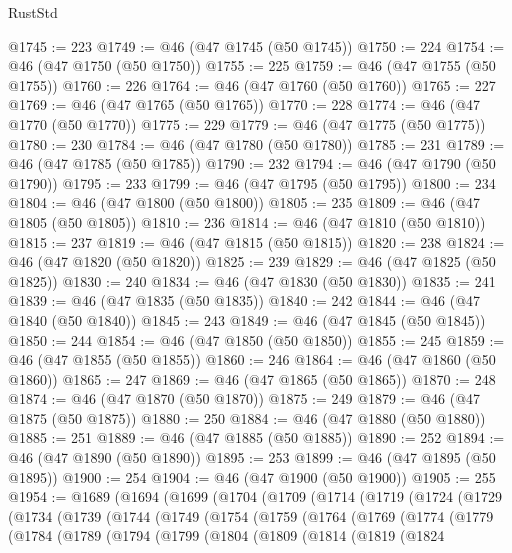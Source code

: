\begin{lexlean}{RustStd}
\begin{coremodule}
@1745 := 223
@1749 := @46 (@47 @1745 (@50 @1745))
@1750 := 224
@1754 := @46 (@47 @1750 (@50 @1750))
@1755 := 225
@1759 := @46 (@47 @1755 (@50 @1755))
@1760 := 226
@1764 := @46 (@47 @1760 (@50 @1760))
@1765 := 227
@1769 := @46 (@47 @1765 (@50 @1765))
@1770 := 228
@1774 := @46 (@47 @1770 (@50 @1770))
@1775 := 229
@1779 := @46 (@47 @1775 (@50 @1775))
@1780 := 230
@1784 := @46 (@47 @1780 (@50 @1780))
@1785 := 231
@1789 := @46 (@47 @1785 (@50 @1785))
@1790 := 232
@1794 := @46 (@47 @1790 (@50 @1790))
@1795 := 233
@1799 := @46 (@47 @1795 (@50 @1795))
@1800 := 234
@1804 := @46 (@47 @1800 (@50 @1800))
@1805 := 235
@1809 := @46 (@47 @1805 (@50 @1805))
@1810 := 236
@1814 := @46 (@47 @1810 (@50 @1810))
@1815 := 237
@1819 := @46 (@47 @1815 (@50 @1815))
@1820 := 238
@1824 := @46 (@47 @1820 (@50 @1820))
@1825 := 239
@1829 := @46 (@47 @1825 (@50 @1825))
@1830 := 240
@1834 := @46 (@47 @1830 (@50 @1830))
@1835 := 241
@1839 := @46 (@47 @1835 (@50 @1835))
@1840 := 242
@1844 := @46 (@47 @1840 (@50 @1840))
@1845 := 243
@1849 := @46 (@47 @1845 (@50 @1845))
@1850 := 244
@1854 := @46 (@47 @1850 (@50 @1850))
@1855 := 245
@1859 := @46 (@47 @1855 (@50 @1855))
@1860 := 246
@1864 := @46 (@47 @1860 (@50 @1860))
@1865 := 247
@1869 := @46 (@47 @1865 (@50 @1865))
@1870 := 248
@1874 := @46 (@47 @1870 (@50 @1870))
@1875 := 249
@1879 := @46 (@47 @1875 (@50 @1875))
@1880 := 250
@1884 := @46 (@47 @1880 (@50 @1880))
@1885 := 251
@1889 := @46 (@47 @1885 (@50 @1885))
@1890 := 252
@1894 := @46 (@47 @1890 (@50 @1890))
@1895 := 253
@1899 := @46 (@47 @1895 (@50 @1895))
@1900 := 254
@1904 := @46 (@47 @1900 (@50 @1900))
@1905 := 255
@1954 := @1689
    (@1694
      (@1699
        (@1704
          (@1709
            (@1714
              (@1719
                (@1724
                  (@1729
                    (@1734
                      (@1739
                        (@1744
                          (@1749
                            (@1754
                              (@1759
                                (@1764
                                  (@1769
                                    (@1774
                                      (@1779
                                        (@1784
                                          (@1789
                                            (@1794
                                              (@1799
                                                (@1804
                                                  (@1809
                                                    (@1814
                                                      (@1819
                                                        (@1824

\end{coremodule}
\end{lexlean}
